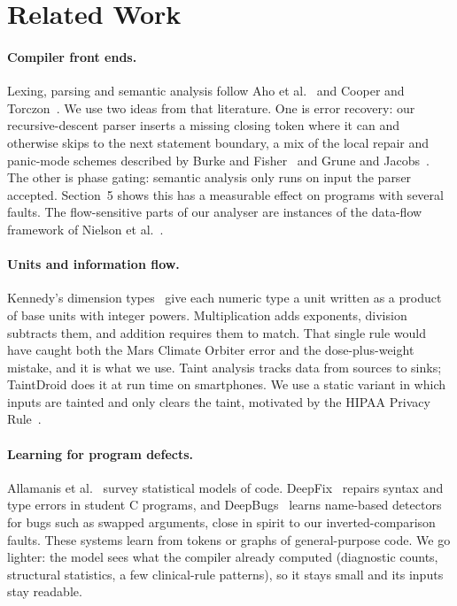 \section{Related Work}

\paragraph{Compiler front ends.} Lexing, parsing and semantic analysis follow Aho et al.~\cite{aho2006} and Cooper and
Torczon~\cite{cooper2007}. We use two ideas from that literature. One is error recovery: our recursive-descent parser
inserts a missing closing token where it can and otherwise skips to the next statement boundary, a mix of the local
repair and panic-mode schemes described by Burke and Fisher~\cite{burke1987} and Grune and Jacobs~\cite{grune2008}. The
other is phase gating: semantic analysis only runs on input the parser accepted. Section~5 shows this has a measurable
effect on programs with several faults. The flow-sensitive parts of our analyser are instances of the data-flow
framework of Nielson et al.~\cite{nielson1999}.

\paragraph{Units and information flow.} Kennedy's dimension types~\cite{kennedy1994} give each numeric type a unit
written as a product of base units with integer powers. Multiplication adds exponents, division subtracts them, and
addition requires them to match. That single rule would have caught both the Mars Climate Orbiter error and the
dose-plus-weight mistake, and it is what we use. Taint analysis tracks data from sources to sinks; TaintDroid
\cite{enck2010} does it at run time on smartphones. We use a static variant in which  inputs are tainted and
only  clears the taint, motivated by the HIPAA Privacy Rule~\cite{hipaa}.

\paragraph{Learning for program defects.} Allamanis et al.~\cite{allamanis2018} survey statistical models of code.
DeepFix~\cite{gupta2017} repairs syntax and type errors in student C programs, and DeepBugs~\cite{pradel2018} learns
name-based detectors for bugs such as swapped arguments, close in spirit to our inverted-comparison faults. These
systems learn from tokens or graphs of general-purpose code. We go lighter: the model sees what the compiler already
computed (diagnostic counts, structural statistics, a few clinical-rule patterns), so it stays small and its inputs
stay readable.

